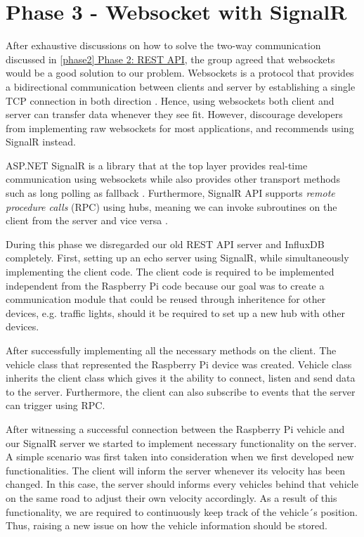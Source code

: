 \section{Phase 3 - Websocket with SignalR}\label{phase3}
After exhaustive discussions on how to solve the two-way communication discussed in \hyperref[phase2]{\ref{phase2} Phase 2: REST API}, the group agreed that websockets would be a good solution to our problem. Websockets is a protocol that provides a bidirectional communication between clients and server by establishing a single TCP connection in both direction \parencite{rfc_websockets}. Hence, using websockets both client and server can transfer data whenever they see fit. However, \cite{microsoft_websockets} discourage developers from implementing raw websockets for most applications, and recommends using SignalR instead.

ASP.NET SignalR is a library that at the top layer provides real-time communication using websockets while also provides other transport methods such as long polling as fallback \parencite{microsoft_signalr}. Furthermore, SignalR API supports \emph{remote procedure calls} (RPC) using hubs, meaning we can invoke subroutines on the client from the server and vice versa \parencite{microsoft_signalr}.

During this phase we disregarded our old REST API server and InfluxDB completely. First, setting up an echo server using SignalR, while simultaneously implementing the client code. The client code is required to be implemented independent from the Raspberry Pi code because our goal was to create a communication module that could be reused through inheritence for other devices, e.g. traffic lights, should it be required to set up a new hub with other devices.

After successfully implementing all the necessary methods on the client. The vehicle class that represented the Raspberry Pi device was created. Vehicle class inherits the client class which gives it the ability to connect, listen and send data to the server. Furthermore, the client can also subscribe to events that the server can trigger using RPC.

After witnessing a successful connection between the Raspberry Pi vehicle and our SignalR server we started to implement necessary functionality on the server. A simple scenario was first taken into consideration when we first developed new functionalities. The client will inform the server whenever its velocity has been changed. In this case, the server should informs every vehicles behind that vehicle on the same road to adjust their own velocity accordingly. As a result of this functionality, we are required to continuously keep track of the vehicle´s position. Thus, raising a new issue on how the vehicle information should be stored.

